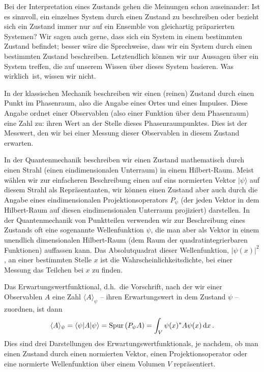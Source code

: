 Bei der Interpretation eines Zustands gehen die Meinungen schon
auseinander: Ist es sinnvoll, ein einzelnes System durch einen Zustand zu beschreiben
oder bezieht sich ein Zustand immer nur auf ein Ensemble von 
gleichartig pr\"aparierten Systemen? Wir sagen auch gerne, dass sich ein System \glqq in einem
bestimmten Zustand befindet\grqq; besser w\"are die Sprechweise, dass \glqq wir ein System durch
einen bestimmten Zustand beschreiben\grqq. Letztendlich k\"onnen wir nur Aussagen \"uber ein
System treffen, die auf unserem Wissen \"uber dieses System basieren. Was \glqq wirklich\grqq\ ist,
wissen wir nicht.

In der klassischen Mechanik beschreiben wir einen (reinen) 
Zustand durch einen Punkt im
Phasenraum, also die Angabe eines Ortes und eines Impulses. Diese Angabe ordnet einer
Observablen (also einer Funktion \"uber dem Phasenraum) eine Zahl zu: ihren Wert an der
Stelle dieses Phasenraumpunktes. Dies ist der Messwert, den wir bei einer Messung dieser
Observablen in diesem Zustand erwarten. 

In der Quantenmechanik 
beschreiben wir einen Zustand mathematisch durch einen Strahl
(einen eindimensionalen Unterraum) in einem Hilbert-Raum. Meist w\"ahlen wir zur einfacheren
Beschreibung einen auf eins normierten Vektor $|\psi\rangle$ auf diesem Strahl als Repr\"asentanten, wir
k\"onnen einen Zustand aber auch durch die Angabe eines eindimensionalen Projektionsoperators $P_\psi$
(der jeden Vektor in dem Hilbert-Raum auf diesen eindimensionalen Unterraum projiziert)
darstellen. In der Quantenmechanik von Punktteilen verwenden wir zur Beschreibung eines
Zustands oft eine sogenannte Wellenfunktion $\psi$, die man aber als Vektor in einem unendlich dimensionalen
Hilbert-Raum (dem Raum der quadratintegrierbaren Funktionen) auffassen kann. Das Absolutquadrat dieser
Wellenfunktion, $|\psi(x)|^2$, an einer bestimmten Stelle $x$ ist die Wahrscheinlichkeitsdichte, bei einer
Messung das Teilchen bei $x$ zu finden.

Das Erwartungswertfunktional, d.h.\ die Vorschrift, nach der
wir einer Observablen $A$ eine Zahl $\langle A \rangle_\psi$ -- ihren Erwartungswert in dem Zustand $\psi$ -- zuordnen, ist
dann 
\begin{equation}
       \langle A \rangle_\psi = \langle \psi | A |  \psi \rangle  = {\rm Spur}\,(P_\psi A) =
                \int_V \psi(x)^* A \psi(x)\,{\rm d} x \, .  
\end{equation}
Dies sind drei Darstellungen des Erwartungswertfunktionals, je nachdem, ob man einen Zustand durch
einen normierten Vektor, einen Projektionsoperator oder eine normierte Wellenfunktion \"uber einem Volumen 
$V$ repr\"asentiert. 


